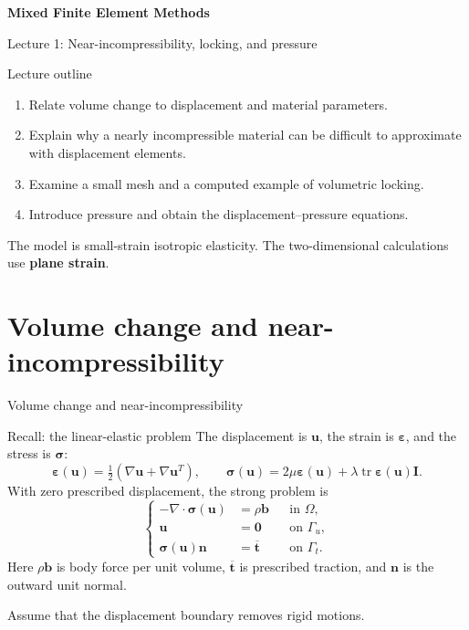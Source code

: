 \documentclass[11pt,aspectratio=169]{beamer}
\newcommand{\bu}{\bm u}
\newcommand{\bn}{\bm n}
\newcommand{\bb}{\bm b}
\newcommand{\bt}{\bm t}
\newcommand{\bI}{\bm I}
\newcommand{\beps}{\bm\varepsilon}
\newcommand{\bsig}{\bm\sigma}
\newcommand{\Om}{\Omega}
\newcommand{\divg}{\nabla\!\cdot}
\DeclareMathOperator{\tr}{tr}
\begin{document}
\begin{frame}
\centering\vfill
{\LARGE\bfseries Mixed Finite Element Methods\par}
\vspace{0.45cm}
{\large Lecture 1: Near-incompressibility, locking, and pressure\par}
\vfill
\end{frame}

\begin{frame}{Lecture outline}
\begin{enumerate}
\item Relate volume change to displacement and material parameters.
\item Explain why a nearly incompressible material can be difficult to
approximate with displacement elements.
\item Examine a small mesh and a computed example of volumetric locking.
\item Introduce pressure and obtain the displacement--pressure equations.
\end{enumerate}
\vspace{0.3cm}
The model is small-strain isotropic elasticity. The two-dimensional
calculations use \textbf{plane strain}.
\end{frame}

\section{Volume change and near-incompressibility}
\begin{frame}
\centering\vfill
{\LARGE Volume change and near-incompressibility\par}
\vfill
\end{frame}

\begin{frame}{Recall: the linear-elastic problem}
The displacement is $\bu$, the strain is $\beps$, and the stress is $\bsig$:
\[
\beps(\bu)=\tfrac12(\nabla\bu+\nabla\bu^T),\qquad
\bsig(\bu)=2\mu\beps(\bu)+\lambda\tr\beps(\bu)\bI.
\]
With zero prescribed displacement, the strong problem is
\[
\left\{\begin{aligned}
-\divg\bsig(\bu)&=\rho\bb &&\text{in }\Om,\\
\bu&=\bm0 &&\text{on }\Gamma_u,\\
\bsig(\bu)\bn&=\overline{\bt} &&\text{on }\Gamma_t.
\end{aligned}\right.
\]
Here $\rho\bb$ is body force per unit volume, $\overline{\bt}$ is prescribed
traction, and $\bn$ is the outward unit normal.

Assume that the displacement boundary removes rigid motions.
\end{frame}
\end{document}

